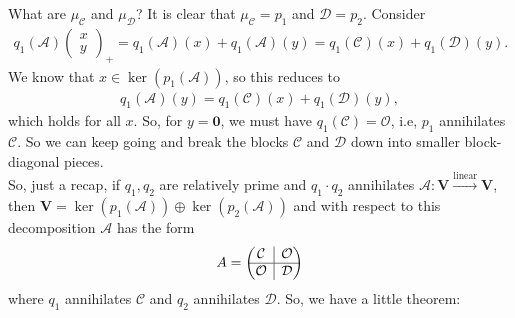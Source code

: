 \documentclass{book}
\theoremstyle{definition}
\newcommand{\V}{\mathbf{V}}
\newcommand{\A}{\mathcal{A}}
\newcommand{\lin}{\overset{\text{linear}}{\longrightarrow}}
\newcommand{\rvline}{\hspace*{-\arraycolsep}\vline\hspace*{-\arraycolsep}}
\begin{document}
What are $\mu_\mathcal{C}$ and $\mu_\mathcal{D}$? It is clear that $\mu_\mathcal{C} = p_1$ and $\mathcal{D} = p_2$. Consider
\begin{align*}
q_1(\A)\begin{pmatrix}
x\\y
\end{pmatrix}_+ = q_1(\mathcal{A})(x) + q_1(\mathcal{A})(y) = q_1(\mathcal{C})(x) + q_1(\mathcal{D})(y).
\end{align*}
We know that $x\in \ker(p_1(\A))$, so this reduces to
\begin{align*}
q_1(\mathcal{A})(y) = q_1(\mathcal{C})(x) + q_1(\mathcal{D})(y),
\end{align*}
which holds for all $x$. So, for $y = \mathbf{0}$, we must have $q_1(\mathcal{C}) = \mathcal{O}$, i.e, $p_1$ annihilates $\mathcal{C}$. So we can keep going and break the blocks $\mathcal{C}$ and $\mathcal{D}$ down into smaller block-diagonal pieces. \\

So, just a recap, if $q_1, q_2$ are relatively prime and $q_1\cdot q_2$ annihilates $\A : \V \lin \V$, then $\V = \ker(p_1(\A)) \oplus \ker(p_2(\A))$ and with respect to this decomposition $\A$ has the form
\begin{align*}
A = \begin{pmatrix}
\mathcal{C} & \rvline & \mathcal{O}\\
\hline
\mathcal{O} & \rvline & \mathcal{D}
\end{pmatrix}
\end{align*}
where $q_1$ annihilates $\mathcal{C}$ and $q_2$ annihilates $\mathcal{D}$. So, we have a little theorem:
\end{document}
